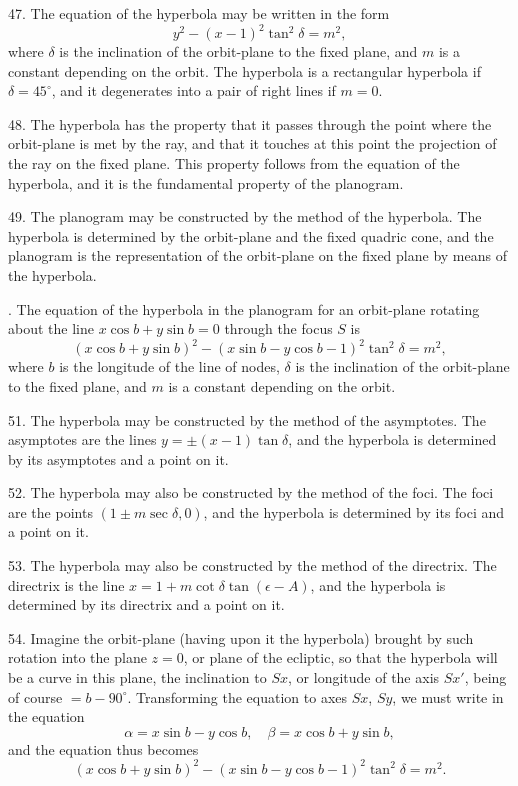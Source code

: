\documentclass[11pt,a4paper]{article}
\theoremstyle{definition}
\begin{document}
47. The equation of the hyperbola may be written in the form
\[
y^2 - (x-1)^2\tan^2\delta = m^2,
\]
where $\delta$ is the inclination of the orbit-plane to the fixed plane, and $m$ is a constant
depending on the orbit. The hyperbola is a rectangular hyperbola if $\delta=45^\circ$, and it
degenerates into a pair of right lines if $m=0$.

48. The hyperbola has the property that it passes through the point where the orbit-plane
is met by the ray, and that it touches at this point the projection of the ray on the
fixed plane. This property follows from the equation of the hyperbola, and it is the
fundamental property of the planogram.

49. The planogram may be constructed by the method of the hyperbola. The hyperbola
is determined by the orbit-plane and the fixed quadric cone, and the planogram is the
representation of the orbit-plane on the fixed plane by means of the hyperbola.

\newpage
{}. The equation of the hyperbola in the planogram for an orbit-plane rotating about
the line $x\cos b + y\sin b = 0$ through the focus $S$ is
\[
(x\cos b + y\sin b)^2 - (x\sin b - y\cos b - 1)^2\tan^2\delta = m^2,
\]
where $b$ is the longitude of the line of nodes, $\delta$ is the inclination of the orbit-plane to the
fixed plane, and $m$ is a constant depending on the orbit.

51. The hyperbola may be constructed by the method of the asymptotes. The asymptotes
are the lines $y = \pm(x-1)\tan\delta$, and the hyperbola is determined by its asymptotes
and a point on it.

52. The hyperbola may also be constructed by the method of the foci. The foci are
the points $(1\pm m\sec\delta, 0)$, and the hyperbola is determined by its foci and a point on it.

53. The hyperbola may also be constructed by the method of the directrix. The directrix
is the line $x = 1 + m\cot\delta\tan(\epsilon - A)$, and the hyperbola is determined by its directrix
and a point on it.

54. Imagine the orbit-plane (having upon it the hyperbola) brought by such rotation
into the plane $z=0$, or plane of the ecliptic, so that the hyperbola will be a curve in this
plane, the inclination to $Sx$, or longitude of the axis $Sx'$, being of course $=b-90^\circ$.
Transforming the equation to axes $Sx$, $Sy$, we must write in the equation
\[
\alpha = x\sin b - y\cos b, \quad \beta = x\cos b + y\sin b,
\]
and the equation thus becomes
\[
(x\cos b + y\sin b)^2 - (x\sin b - y\cos b - 1)^2\tan^2\delta = m^2.
\]
\end{document}
